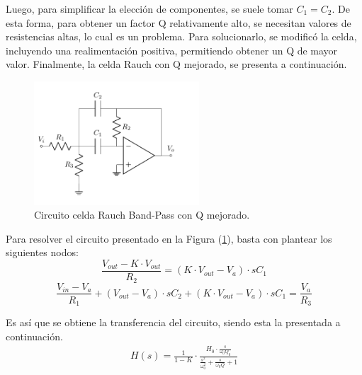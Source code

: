 Luego, para simplificar la elección de componentes, se suele tomar $C_1 = C_2$. De esta forma, para obtener un factor Q relativamente alto, se necesitan valores de resistencias altas, lo cual es un problema. Para solucionarlo, se modificó la celda, incluyendo una realimentación positiva, permitiendo obtener un Q de mayor valor. Finalmente, la celda Rauch con Q mejorado, se presenta a continuación.
\begin{figure}[H]
	\centering
	\includegraphics[width=0.55\textwidth, page=2]{Imagenes-Ej2/Circuitos.pdf}
	\caption{Circuito celda Rauch Band-Pass con Q mejorado.}	
	\label{fig:rauch2}	
\end{figure}

Para resolver el circuito presentado en la Figura (\ref{fig:rauch2}), basta con plantear los siguientes nodos:
\begin{equation}
	\frac{V_{out}-K \cdot V_{out}}{R_2}=(K \cdot V_{out}-V_a)\cdot sC_1
\end{equation}
\begin{equation}
	\frac{V_{in}-V_a}{R_1}+(V_{out}-V_a)\cdot sC_2 +(K \cdot V_{out}-V_a) \cdot sC_1 = \frac{V_a}{R_3}
\end{equation}

Es así que se obtiene la transferencia del circuito, siendo esta la presentada a continuación.
\begin{align}
H(s)=\frac{1}{1-K} \cdot \frac{H_0 \cdot \frac{s}{\omega_0 Q_0}}{\frac{s^2}{\omega_0^2}+\frac{s}{\omega_0Q}+1}
\end{align}

